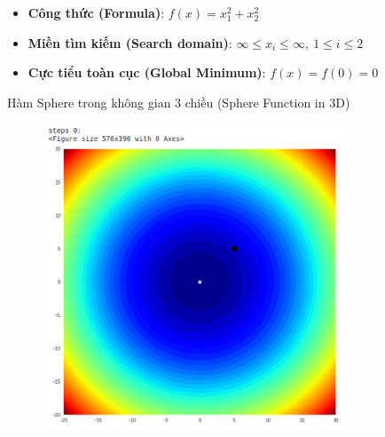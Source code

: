 \documentclass{book}
\begin{document}
\begin{itemize}
\begin{figure}[H]
\begin{minipage}[c]{0.45\textwidth}
            \caption{Hàm Sphere trong không gian 3 chiều (Sphere Function in 3D)}
            \label{fig:sphere_function}
        \end{minipage}
        \begin{minipage}[c]{0.45\textwidth}
            \begin{itemize}
                \item[] \textbf{Công thức (Formula)}: $f(x)=x_1^2+x_2^2$
                \item[] \textbf{Miền tìm kiếm (Search domain)}: $\infty\leq x_i\leq \infty, \ 1\leq i\leq2$
                \item[] \textbf{Cực tiểu toàn cục (Global Minimum)}: $f(x)=f(0)=0$
            \end{itemize}
        \end{minipage}
    \end{figure}
    \begin{figure}[H]
        \begin{figure}[H]
            \begin{minipage}[c]{0.3\textwidth}
                \centering
                \includegraphics[width=\textwidth]{images/one_plus_one_ex_step_0.png}
            \end{minipage}
            \begin{minipage}[c]{0.3\textwidth}

\end{minipage}
\end{figure}
\end{figure}
\end{itemize}
\end{document}
